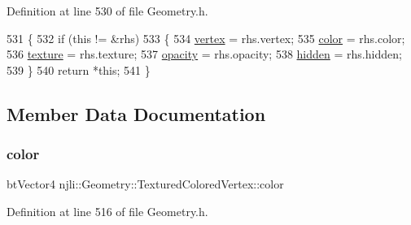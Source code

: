 Definition at line 530 of file Geometry.\+h.


\begin{DoxyCode}
531       \{
532         \textcolor{keywordflow}{if} (\textcolor{keyword}{this} != &rhs)
533           \{
534             \mbox{\hyperlink{structnjli_1_1_geometry_1_1_textured_colored_vertex_ab49b5720f1cdbf1c63e62681db8f090f}{vertex}} = rhs.vertex;
535             \mbox{\hyperlink{structnjli_1_1_geometry_1_1_textured_colored_vertex_a79e6bb9cb0daa0307eac09b828e4d993}{color}} = rhs.color;
536             \mbox{\hyperlink{structnjli_1_1_geometry_1_1_textured_colored_vertex_a933ff52f4cd0a7768836e458f1a1218c}{texture}} = rhs.texture;
537             \mbox{\hyperlink{structnjli_1_1_geometry_1_1_textured_colored_vertex_a8c7d91ac68083909b5116f7d130c39ca}{opacity}} = rhs.opacity;
538             \mbox{\hyperlink{structnjli_1_1_geometry_1_1_textured_colored_vertex_a506ec1fdd64c4b0530a33a53d075c3d2}{hidden}} = rhs.hidden;
539           \}
540         \textcolor{keywordflow}{return} *\textcolor{keyword}{this};
541       \}
\end{DoxyCode}


\subsection{Member Data Documentation}
\mbox{\label{structnjli_1_1_geometry_1_1_textured_colored_vertex_a79e6bb9cb0daa0307eac09b828e4d993}} 
\subsubsection{\texorpdfstring{color}{color}}
{\footnotesize\ttfamily bt\+Vector4 njli\+::\+Geometry\+::\+Textured\+Colored\+Vertex\+::color}



Definition at line 516 of file Geometry.\+h.

\mbox{\label{structnjli_1_1_geometry_1_1_textured_colored_vertex_a506ec1fdd64c4b0530a33a53d075c3d2}} 
